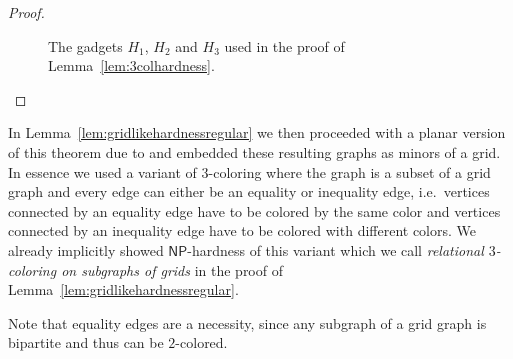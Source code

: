\documentclass[10pt,a4paper]{article}
\numberwithin{equation}{section}
\theoremstyle{definition}
\newcommand{\NP}{\ensuremath{\mathsf{NP}}}
\begin{document}
\begin{proof}
\begin{figure}[tpb]
        \hskip 20pt
        \caption{The gadgets $H_1$, $H_2$ and $H_3$ used in the proof of Lemma~\ref{lem:3colhardness}.}
        \label{fig:3colgadgets}
    \end{figure}
\end{proof}

In Lemma~\ref{lem:gridlikehardnessregular} we then proceeded with a planar version of this theorem due to \cite{DBLP:journals/tcs/GareyJS76} and embedded these resulting graphs as minors of a grid.
In essence we used a variant of $3$-coloring where the graph is a subset of a grid graph and every edge can either be an equality or inequality edge, i.e.\ vertices connected by an equality edge have to be colored by the same color and vertices connected by an inequality edge have to be colored with different colors.
We already implicitly showed $\NP$-hardness of this variant which we call \emph{relational $3$-coloring on subgraphs of grids} in the proof of Lemma~\ref{lem:gridlikehardnessregular}.

Note that equality edges are a necessity, since any subgraph of a grid graph is bipartite and thus can be $2$-colored.
\end{document}
